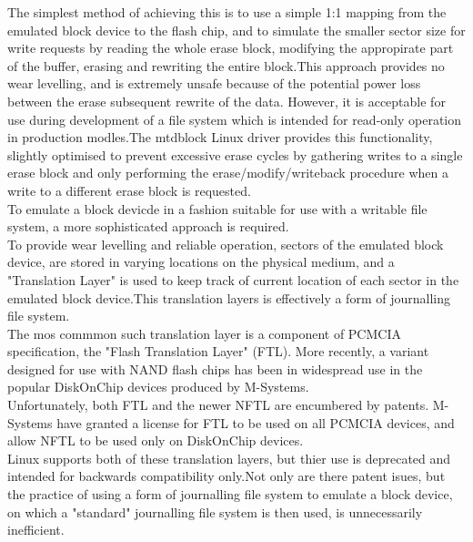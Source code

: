 \documentclass[conference]{IEEEtran}
\begin{document}
The simplest method of achieving this is to use a simple 1:1 mapping from the emulated
block device to the flash chip, and to simulate the smaller sector size for write requests
by reading the whole erase block, modifying the appropirate part of the buffer, erasing and rewriting
the entire block.This approach provides no wear levelling, and is extremely unsafe 
because of the potential power loss between the erase subsequent rewrite of the data.
However, it is acceptable for use during development of a file system which is intended
for read-only operation in production modles.The mtdblock Linux driver provides this 
functionality, slightly optimised to prevent excessive erase cycles by gathering writes
to a single erase block and only performing the erase/modify/writeback procedure when a 
write to a different erase block is requested. \\

To emulate a block devicde in a fashion suitable for use with a writable file system, 
a more sophisticated approach is required. \\

To provide wear levelling and reliable operation, sectors of the emulated block device,
are stored in varying locations on the physical medium, and a "Translation Layer" is used
to keep track of current location of each sector in the emulated block device.This 
translation layers is effectively a form of journalling file system. \\

The mos commmon such translation layer is a component of PCMCIA specification, the "Flash
Translation Layer" (FTL). More recently, a variant designed for use with NAND flash chips has been
in widespread use in the popular DiskOnChip devices produced by M-Systems. \\

Unfortunately, both FTL and the newer NFTL are encumbered by patents. M-Systems have granted
a license for FTL to be used on all PCMCIA devices, and allow NFTL to be used only on     
DiskOnChip devices. \\

Linux supports both of these translation layers, but thier use is deprecated and intended for 
backwards compatibility only.Not only are there patent isues, but the practice of 
using a form of journalling file system to emulate a block device, on which a "standard"
journalling file system is then used, is unnecessarily inefficient. \\
\end{document}
